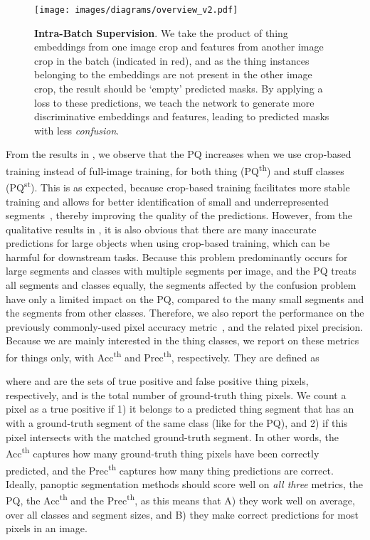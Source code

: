 \documentclass[10pt,twocolumn,letterpaper]{article}
\begin{document}
\begin{figure*}[t]
\centering
\texttt{[image: images/diagrams/overview\_v2.pdf]}
\caption{\textbf{Intra-Batch Supervision}. We take the product of thing embeddings  from one image crop and features  from another image crop in the batch (indicated in red), and as the thing instances belonging to the embeddings are not present in the other image crop, the result should be `empty' predicted masks. By applying a loss to these predictions, we teach the network to generate more discriminative embeddings and features, leading to predicted masks with less \textit{confusion}.}
\label{fig:overview}
\vspace{-5pt}
\end{figure*} 
From the results in , we observe that the PQ increases when we use crop-based training instead of full-image training, for both thing (PQ\textsuperscript{th}) and stuff classes (PQ\textsuperscript{st}). This is as expected, because crop-based training facilitates more stable training and allows for better identification of small and underrepresented segments~\cite{porzi2021allscales}, thereby improving the quality of the predictions. However, from the qualitative results in , it is also obvious that there are many inaccurate predictions for large objects when using crop-based training, which can be harmful for downstream tasks. Because this problem predominantly occurs for large segments and classes with multiple segments per image, and the PQ treats all segments and classes equally, the segments affected by the confusion problem have only a limited impact on the PQ, compared to the many small segments and the segments from other classes.
Therefore, we also report the performance on the previously commonly-used pixel accuracy metric~\cite{hurtado2022pa}, and the related pixel precision. Because we are mainly interested in the thing classes, we report on these metrics for things only, with Acc\textsuperscript{th} and Prec\textsuperscript{th}, respectively. They are defined as


where  and  are the sets of true positive and false positive thing pixels, respectively, and  is the total number of ground-truth thing pixels. We count a pixel as a true positive if 1) it belongs to a predicted thing segment that has an  with a ground-truth segment of the same class (like for the PQ), and 2) if this pixel intersects with the matched ground-truth segment. In other words, the Acc\textsuperscript{th} captures how many ground-truth thing pixels have been correctly predicted, and the Prec\textsuperscript{th} captures how many thing predictions are correct. Ideally, panoptic segmentation methods should score well on \textit{all three} metrics, the PQ, the Acc\textsuperscript{th} and the Prec\textsuperscript{th}, as this means that A) they work well on average, over all classes and segment sizes, and B) they make correct predictions for most pixels in an image.
\end{document}
